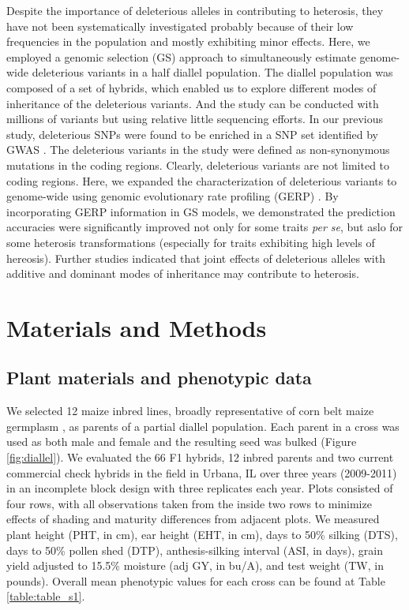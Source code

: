 \documentclass[9pt,twocolumn,twoside]{gsajnl}
\begin{document}
Despite the importance of deleterious alleles in contributing to heterosis, they have not been systematically investigated probably because of their low frequencies in the population and mostly exhibiting minor effects. Here, we employed a genomic selection (GS) approach to simultaneously estimate genome-wide deleterious variants in a half diallel population. The diallel population was composed of a set of hybrids, which enabled us to explore different modes of inheritance of the deleterious variants. And the study can be conducted with millions of variants but using relative little sequencing efforts. In our previous study, deleterious SNPs were found to be enriched in a SNP set identified by GWAS \citep{Mezmouk2014}. The deleterious variants in the study were defined as non-synonymous mutations in the coding regions. Clearly, deleterious variants are not limited to coding regions. Here, we expanded the characterization of deleterious variants to genome-wide using genomic evolutionary rate profiling (GERP) \citep{Cooper2005}. By incorporating GERP information in GS models, we demonstrated the prediction accuracies were significantly improved not only for some traits \emph{per se}, but aslo for some heterosis transformations (especially for traits exhibiting high levels of hereosis). Further studies indicated that joint effects of deleterious alleles with additive and dominant modes of inheritance may contribute to heterosis.


\section*{Materials and Methods} 

\subsection*{Plant materials and phenotypic data}
We selected 12 maize inbred lines, broadly representative of corn belt maize germplasm \citep{mikel2006evolution}, as parents of a partial diallel population. 
Each parent in a cross was used as both male and female and the resulting seed was bulked  (Figure \ref{fig:diallel}). 
We evaluated the 66 F1 hybrids, 12 inbred parents and two current commercial check hybrids in the field in Urbana, IL over three years (2009-2011) in an incomplete block design with three replicates each year.  
Plots consisted of four rows, with all observations taken from the inside two rows to minimize effects of shading and maturity differences from adjacent plots.  
We measured plant height (PHT, in cm), ear height (EHT, in cm), days to 50\% silking (DTS), days to 50\% pollen shed (DTP), anthesis-silking interval (ASI, in days), grain yield adjusted to 15.5\% moisture (adj GY, in bu/A), and test weight (TW, in pounds). 
Overall mean phenotypic values for each cross can be found at Table \ref{table:table_s1}.
\end{document}
